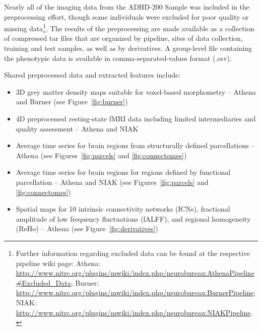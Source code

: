 \documentclass[preprint,12pt,3p]{elsarticle}
\providecommand{\tightlist}{%
  \setlength{\itemsep}{0pt}\setlength{\parskip}{0pt}}
\begin{document}
Nearly all of the imaging data from the ADHD-200 Sample was included in the preprocessing effort, though some individuals were excluded for poor quality or missing data\footnote{Further information regarding excluded data can be found at the respective pipeline wiki page: Athena: \url{http://www.nitrc.org/plugins/mwiki/index.php/neurobureau:AthenaPipeline#Excluded_Data}; Burner: \url{http://www.nitrc.org/plugins/mwiki/index.php/neurobureau:BurnerPipeline}; NIAK: \url{http://www.nitrc.org/plugins/mwiki/index.php/neurobureau:NIAKPipeline}.}.
The results of the preprocessing are made available as a collection of compressed tar files that are organized by pipeline, sites of data collection, training and test samples, as well as by derivatives. A group-level file containing the phenotypic data is available in comma-separated-values format (.csv). 

Shared preprocessed data and extracted features include:
\begin{itemize}
\tightlist
    \item 3D grey matter density maps suitable for voxel-based morphometry -- Athena and Burner (see Figure~\ref{fig:burner})
    \item 4D preprocessed resting-state fMRI data including limited intermediaries and quality assessment -- Athena and NIAK
    \item Average time series for brain regions from structurally defined parcellations -- Athena (see Figures~\ref{fig:parcels} and \ref{fig:connectomes})
    \item Average time series for brain regions for regions defined by functional parcellation -- Athena and NIAK (see Figures~\ref{fig:parcels} and \ref{fig:connectomes})
    \item Spatial maps for 10 intrinsic connectivity networks (ICNs), fractional amplitude of low frequency fluctuations (fALFF), and regional homogeneity (ReHo) -- Athena (see Figure~\ref{fig:derivatives})
\end{itemize}

\end{document}
